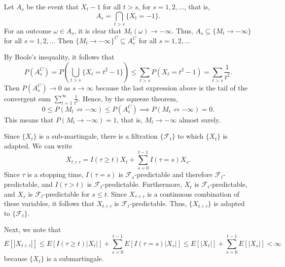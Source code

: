 \documentclass{homework}
\newcommand{\fil}{\mathcal{F}}
\begin{document}
	\question Let $A_s$ be the event that $X_t -1$ for all $t>s$, for $s=1,2,\dots$, that is,
	\begin{equation*}
		A_s = \bigcap_{t>s}\{X_t = -1\}.
	\end{equation*}
	For an outcome $\omega \in A_s$, it is clear that $M_t(\omega) \to -\infty$. Thus, $A_s \subseteq\{M_t \to -\infty\}$ for all $s =1,2,\dots$ Then $\{M_t\to-\infty\}^C \subseteq A_s^C$ for all $s=1,2,\dots$
	
	By Boole's inequality, it follows that
	\begin{equation*}
		P\left(A_s^C\right) = P\left(\bigcup_{t> s}\{X_t = t^2-1\}\right) \le \sum_{t>s}P(X_t = t^2-1) = \sum_{t>s}\frac{1}{t^2}.
	\end{equation*}
	Then $P\left(A_s^C\right) \to 0$ as $s \to \infty$ because the last expression above is the tail of the convergent sum $\sum\limits_{t=1}^\infty\frac{1}{t^2}$. Hence, by the squeeze theorem,
	\begin{equation*}
		0 \le P(M_t\not\to-\infty) \le P(A_s^C) \implies P(M_t\not\to-\infty) = 0.
	\end{equation*}
	This means that $P(M_t\to -\infty) =1$, that is, $M_t \to -\infty$ almost surely.
	
	\question Since $\{X_t\}$ is a sub-martingale, there is a filtration $\{\fil_t\}$ to which $\{X_t\}$ is adapted. We can write
	\begin{equation*}
		X_{t\wedge \tau} = I(\tau \ge t)X_t + \sum_{s=0}^{t-1}I(\tau = s)X_s.
	\end{equation*}
	Since $\tau$ is a stopping time, $I(\tau=s)$ is $\fil_s$-predictable and therefore $\fil_t$-predictable, and $I(\tau > t)$ is $\fil_t$-predictable. Furthermore, $X_t$ is $\fil_t$-predictable, and $X_s$ is $\fil_t$-predictable for $s \le t$. Since $X_{\tau\wedge\tau}$ is a continuous combination of these variables, it follows that $X_{t\wedge\tau}$ is $\fil_t$-predictable. Thus, $\{X_{t\wedge\tau}\}$ is adapted to $\{\fil_t\}$.
	
	Next, we note that
	\begin{equation*}
		E[|X_{t\wedge \tau}|] \le E[I(\tau \ge t)|X_t|] + \sum_{s=0}^{t-1}E[I(\tau=s)|X_s|] \le E[|X_t|] + \sum_{s=0}^{t-1}E[|X_s|] < \infty
	\end{equation*}
	because $\{X_t\}$ is a submartingale.
	
\end{document}
